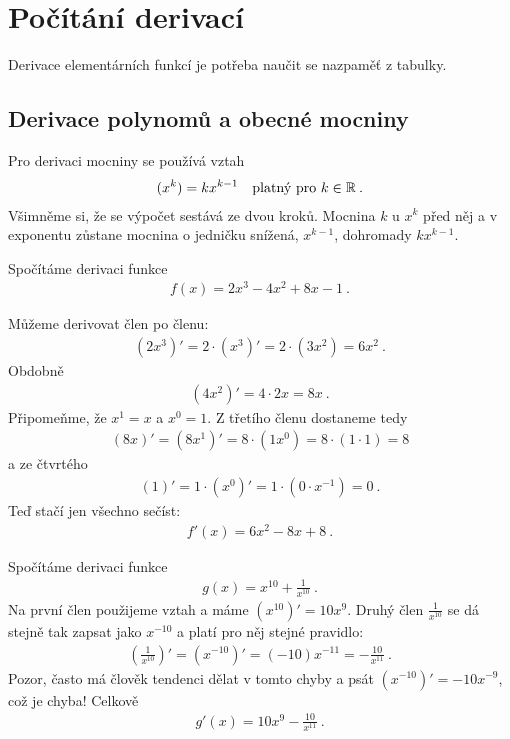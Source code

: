 \section*{Počítání derivací}

Derivace elementárních funkcí je potřeba naučit se nazpaměť z tabulky.

\subsection*{Derivace polynomů a obecné mocniny}

Pro derivaci mocniny se používá vztah
\begin{align}
    (x^k) = k x^{k-1} \quad \text{platný pro } k \in \mathbb{R} \:.
\end{align}
Všimněme si, že se výpočet sestává ze dvou kroků. Mocnina $k$ u $x^k$  před něj a v exponentu zůstane mocnina o jedničku snížená, $x^{k-1}$, dohromady $k x^{k-1}$.

\begin{example}
    Spočítáme derivaci funkce 
    \begin{align}
        f(x) = 2x^3 - 4x^2 + 8x - 1 \:.
    \end{align}

    Můžeme derivovat člen po členu: 
    \begin{align}
        (2x^3)'=2 \cdot (x^3)' = 2 \cdot (3 x^2) = 6 x^2 \:.
    \end{align}
    Obdobně
    \begin{align}
        (4x^2)' = 4 \cdot 2x = 8x \:.
    \end{align}
    Připomeňme, že $x^1=x$ a $x^0=1$. Z třetího členu dostaneme tedy
    \begin{align}
        (8x)'=(8x^1)'=8 \cdot (1x^0)= 8 \cdot (1 \cdot 1) = 8
    \end{align}
    a ze čtvrtého
    \begin{align}
        (1)' = 1 \cdot (x^0)'= 1 \cdot (0 \cdot x^{-1}) = 0 \:. 
    \end{align}
    Teď stačí jen všechno sečíst:
    \begin{align}
        f'(x) =  6 x^2 - 8x + 8 \:.
    \end{align}
\end{example}

\begin{example}
    Spočítáme derivaci funkce
    \begin{align}
        g(x) = x^{10} + \frac{1}{x^{10}} \:.
    \end{align}
    Na první člen použijeme vztah a máme $(x^{10})' = 10 x^9$. Druhý člen $\frac{1}{x^{10}}$ se dá stejně tak zapsat jako $x^{-10}$ a platí pro něj stejné pravidlo:
    \begin{align}
        \left( \frac{1}{x^{10}}\right)' = (x^{-10})' = (-10) x^{-11} = - \frac{10}{x^{11}} \:.
    \end{align}
    Pozor, často má člověk tendenci dělat v tomto chyby a psát $(x^{-10})'=-10 x^{-9}$, což je chyba!
    Celkově 
    \begin{align}
        g'(x) = 10 x^9 - \frac{10}{x^{11}} \:.
    \end{align}
\end{example}

